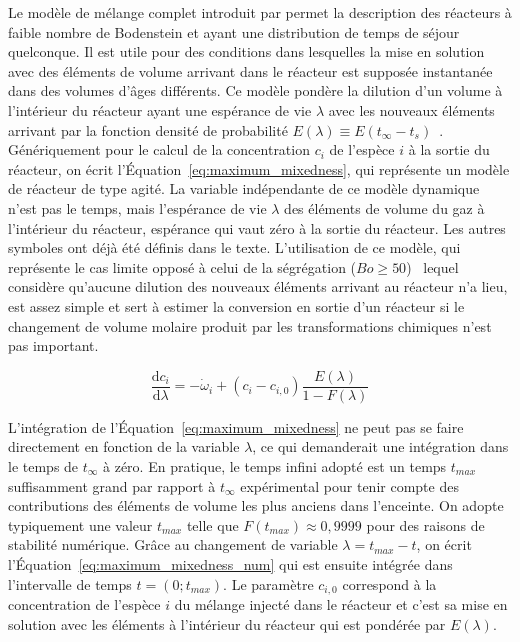Le modèle de mélange complet introduit par \citet{Zwietering1959} permet la description des réacteurs à faible nombre de Bodenstein et ayant une distribution de temps de séjour quelconque. Il est utile pour des conditions dans lesquelles la mise en solution avec des éléments de volume arrivant dans le réacteur est supposée instantanée dans des volumes \og{}d'âges\fg{}  différents. Ce modèle pondère la dilution d'un volume à l'intérieur du réacteur ayant une espérance de vie $\lambda$ avec les nouveaux éléments arrivant par la fonction densité de probabilité $E(\lambda)\equiv{E(t_{\infty}-t_{s})}$~\cite{Fogler1999,Himmelblau1997}. Génériquement pour le calcul de la concentration $c_{i}$ de l'espèce $i$ à la sortie du réacteur, on écrit l'Équation~\ref{eq:maximum_mixedness}, qui représente un modèle de réacteur de type agité. La variable indépendante de ce modèle dynamique n'est pas le temps, mais l'espérance de vie $\lambda$ des éléments de volume du gaz à l'intérieur du réacteur, espérance qui vaut zéro à la sortie du réacteur. Les autres symboles ont déjà été définis dans le texte. L'utilisation de ce modèle, qui représente le cas limite opposé à celui de la ségrégation ($Bo{}\geq{}50$)~\cite{Becker1998177,Fogler1999} lequel considère qu'aucune dilution des nouveaux éléments arrivant au réacteur n'a lieu, est assez simple et sert à estimer la conversion en sortie d'un réacteur si le changement de volume molaire produit par les transformations chimiques n'est pas important.

\begin{equation}
\frac{\mathrm{d}c_{i}}{\mathrm{d}\lambda}=
-\dot{\omega}_{i}+(c_{i}-c_{i,0})\frac{E(\lambda)}{1-F(\lambda)}
\label{eq:maximum_mixedness}
\end{equation}

L'intégration de l'Équation~\ref{eq:maximum_mixedness} ne peut pas se faire directement en fonction de la variable $\lambda$, ce qui demanderait une intégration dans le temps de $t_{\infty}$ à zéro. En pratique, le temps infini adopté est un temps $t_{max}$ suffisamment grand par rapport à $t_{\infty}$ expérimental pour tenir compte des contributions des éléments de volume les plus anciens dans l'enceinte. On adopte typiquement une valeur $t_{max}$ telle que $F\left(t_{max}\right)\approx{}0,9999$ pour des raisons de stabilité numérique. Grâce au changement de variable $\lambda=t_{max}-t$, on écrit l'Équation~\ref{eq:maximum_mixedness_num} qui est ensuite intégrée dans l'intervalle de temps $t=(0;t_{max})$. Le paramètre $c_{i,0}$ correspond à la concentration de l'espèce $i$ du mélange injecté dans le réacteur et c'est sa mise en solution avec les éléments à l'intérieur du réacteur qui est pondérée par $E(\lambda)$.

